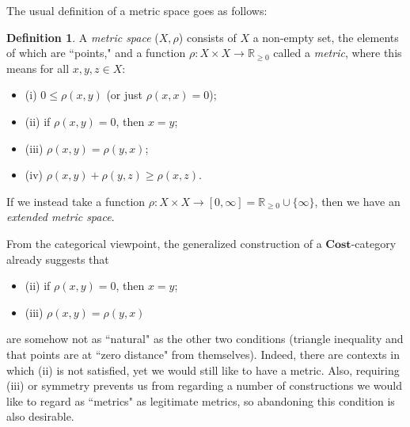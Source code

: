 \documentclass[a4paper]{book}
\theoremstyle{definition}
\theoremstyle{definition}
\newtheorem{definition}{Definition}[section]
\theoremstyle{definition}
\theoremstyle{theorem}
\theoremstyle{definition}
\begin{document}
The usual definition of a metric space goes as follows:  
\begin{definition}
	A \textit{metric space}  ($X, \rho$) consists of $X$ a non-empty set, the elements of which are ``points," and a function $\rho: X \times X \rightarrow \mathbb{R}_{\geq 0}$ called a \textit{metric}, where this means for all $x,y,z \in X$: 
	\begin{itemize}
		\item (i) $0 \leq \rho(x,y)$ (or just $\rho(x,x) = 0$); 
		\item (ii) if $ \rho(x,y) = 0$, then $x = y$;
		\item (iii) $\rho(x,y) = \rho(y,x)$; 
		\item (iv) $ \rho(x,y) + \rho(y,z) \geq \rho(x,z)$. 
	\end{itemize}
	If we instead take a function $\rho: X \times X \rightarrow [0, \infty] = \mathbb{R}_{\geq 0} \cup \{\infty\}$, then we have an \textit{extended metric space}. 
\end{definition} \noindent 
From the categorical viewpoint, the generalized construction of a $\textbf{Cost}$-category already suggests that 
\begin{itemize}
	\item (ii) if $\rho(x,y) = 0$, then $x = y$;
	\item (iii) $\rho(x,y) = \rho(y,x)$ 
\end{itemize}
are somehow not as ``natural" as the other two conditions (triangle inequality and that points are at ``zero distance" from themselves). Indeed, there are contexts in which (ii) is not satisfied, yet we would still like to have a metric. Also, requiring (iii) or symmetry prevents us from regarding a number of constructions we would like to regard as ``metrics" as legitimate metrics, so abandoning this condition is also desirable. 
\end{document}
